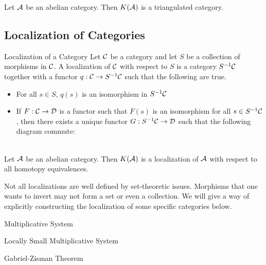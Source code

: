 \documentclass[a4paper]{article}
\begin{document}
\begin{lmm}{}{} Let $\mathcal{A}$ be an abelian category. Then $K(\mathcal{A})$ is a triangulated category. 
\end{lmm}

\subsection{Localization of Categories}
\begin{defn}{Localization of a Category}{} Let $\mathcal{C}$ be a category and let $S$ be a collection of morphisms in $\mathcal{C}$. A localization of $\mathcal{C}$ with respect to $S$ is a category $S^{-1}\mathcal{C}$ together with a functor $q:\mathcal{C}\to S^{-1}\mathcal{C}$ such that the following are true. 
\begin{itemize}
\item For all $s\in S$, $q(s)$ is an isomorphism in $S^{-1}\mathcal{C}$
\item If $F:\mathcal{C}\to\mathcal{D}$ is a functor such that $F(s)$ is an isomorphism for all $s\in S^{-1}\mathcal{C}$, then there exists a unique functor $G:S^{-1}\mathcal{C}\to\mathcal{D}$ such that the following diagram commute: \\~\\
\end{itemize}
\end{defn}

\begin{lmm}{}{} Let $\mathcal{A}$ be an abelian category. Then $K(\mathcal{A})$ is a localization of $\mathcal{A}$ with respect to all homotopy equivalences. 
\end{lmm}

Not all localizations are well defined by set-theoretic issues. Morphisms that one wants to invert may not form a set or even a collection. We will give a way of explicitly constructing the localization of some specific categories below. 

\begin{defn}{Multiplicative System}{}
\end{defn}

\begin{defn}{Locally Small Multiplicative System}{}
\end{defn}

\begin{thm}{Gabriel-Zisman Theorem}{}
\end{thm}
\end{document}

